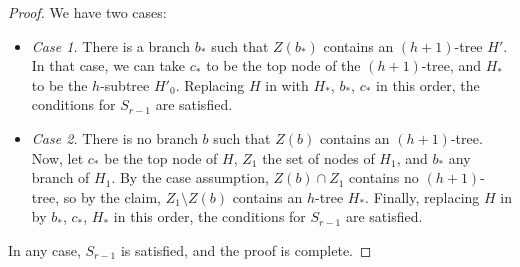 \begin{theorem}
\begin{proof}
            We have two cases:
            \begin{itemize}
                \item \emph{Case 1.} There is a branch $b_*$ such that $Z(b_*)$ contains an $(h+1)$-tree $H'$.
                    In that case, we can take $c_*$ to be the top node of the $(h+1)$-tree, and $H_*$ to be the
                    $h$-subtree $H'_0$.
                    Replacing $H$ in  with $H_*$, $b_*$, $c_*$ in this order, the
                    conditions for $S_{r-1}$ are satisfied.
                \item \emph{Case 2.} There is no branch $b$ such that $Z(b)$ contains an $(h+1)$-tree.
                    Now, let $c_*$ be the top node of $H$, $Z_1$ the set of nodes of $H_1$, and
                    $b_*$ any branch of $H_1$.
                    By the case assumption, $Z(b) \cap Z_1$ contains no $(h+1)$-tree, so by the claim,
                    $Z_1 \setminus Z(b)$ contains an $h$-tree $H_*$.
                    Finally, replacing $H$ in  by $b_*$, $c_*$, $H_*$ in this order, the
                    conditions for $S_{r-1}$ are satisfied.
            \end{itemize}
            In any case, $S_{r-1}$ is satisfied, and the proof is complete.
        \end{proof}
    \end{theorem}
